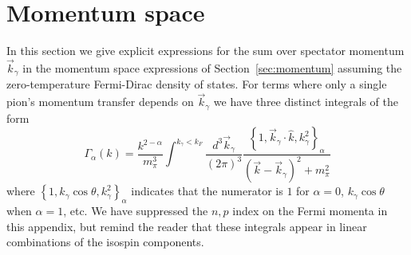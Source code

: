 \section{\label{app:momSums}Momentum space}

In this section we give explicit expressions for the sum over spectator momentum $\vec{k}_\gamma$ in the momentum space expressions of Section~\ref{sec:momentum} assuming the zero-temperature Fermi-Dirac density of states. For terms where only a single pion's momentum transfer depends on $\vec{k}_\gamma$ we have three distinct integrals of the form 
\begin{equation}
\Gamma_{\alpha}(k) = \frac{k^{2-\alpha}}{m_\pi^3}\int^{k_\gamma<k_F}\frac{d^3\vec{k}_\gamma}{(2\pi)^3}  \frac{\left\{1,\vec{k}_\gamma\cdot\hat{k},k_\gamma^2\right\}_\alpha}{(\vec{k}-\vec{k}_\gamma)^2+m_\pi^2}
\end{equation}
where $\left\{1,k_\gamma\cos\theta,k_\gamma^2\right\}_\alpha$ indicates that the numerator is $1$ for $\alpha=0$, $k_\gamma\cos\theta$ when $\alpha=1$, etc. We have suppressed the $n,p$ index on the Fermi momenta in this appendix, but remind the reader that these integrals appear in linear combinations of the isospin components.

